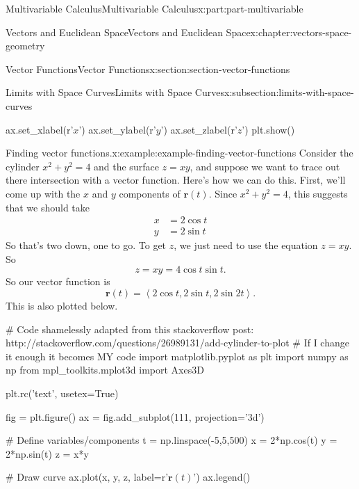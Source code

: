 \documentclass[twoside,10pt,]{book}
\numberwithin{equation}{part}
\newcommand{\dotprod}[1]{\left\langle #1 \right\rangle}
\begin{document}
\begin{partptx}{Multivariable Calculus}{}{Multivariable Calculus}{}{}{x:part:part-multivariable}
\begin{chapterptx}{Vectors and Euclidean Space}{}{Vectors and Euclidean Space}{}{}{x:chapter:vectors-space-geometry}
\begin{sectionptx}{Vector Functions}{}{Vector Functions}{}{}{x:section:section-vector-functions}
\begin{subsectionptx}{Limits with Space Curves}{}{Limits with Space Curves}{}{}{x:subsection:limits-with-space-curves}
\begin{sageinput}
ax.set_xlabel(r'$x$')
ax.set_ylabel(r'$y$')
ax.set_zlabel(r'$z$')
plt.show()
\end{sageinput}
\begin{example}{Finding vector functions.}{x:example:example-finding-vector-functions}%
Consider the cylinder \(x^{2}+y^{2}=4\) and the surface \(z=xy\), and suppose we want to trace out there intersection with a vector function. Here's how we can do this. First, we'll come up with the \(x\) and \(y\) components of \(\mathbf{r}(t)\). Since \(x^{2}+y^{2} = 4\), this suggests that we should take%
%
\begin{align*}
x & = 2\cos t \\
y & = 2\sin t 
\end{align*}
So that's two down, one to go. To get \(z\), we just need to use the equation \(z=xy\). So%
%
\begin{equation*}
z = xy = 4\cos t\sin t.
\end{equation*}
So our vector function is%
%
\begin{equation*}
\mathbf{r}(t) = \dotprod{2\cos t, 2\sin t, 2\sin 2t}.
\end{equation*}
This is also plotted below.%
\end{example}
\begin{sageinput}
# Code shamelessly adapted from this stackoverflow post: http://stackoverflow.com/questions/26989131/add-cylinder-to-plot
# If I change it enough it becomes MY code
import matplotlib.pyplot as plt
import numpy as np
from mpl_toolkits.mplot3d import Axes3D

plt.rc('text', usetex=True)

fig = plt.figure()
ax = fig.add_subplot(111, projection='3d')

# Define variables/components
t = np.linspace(-5,5,500)
x = 2*np.cos(t)
y = 2*np.sin(t)
z = x*y

# Draw curve
ax.plot(x, y, z, label=r'$\mathbf{r}(t)$')
ax.legend()


\end{sageinput}
\end{subsectionptx}
\end{sectionptx}
\end{chapterptx}
\end{partptx}
\end{document}
